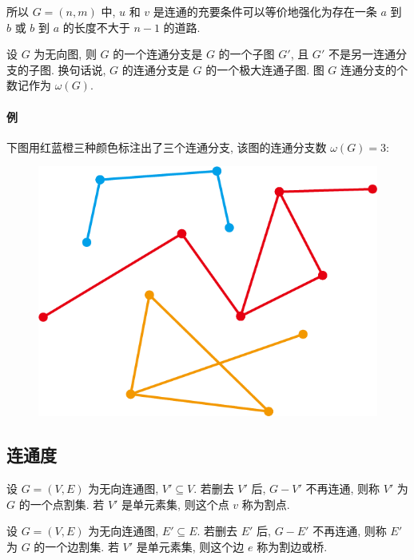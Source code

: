 \documentclass[UTF8]{ctexart}
\theoremstyle{mystyle}
\theoremstyle{myremark}
\theoremstyle{plain}
\begin{document}
所以 $ G = (n, m) $ 中, $ u $ 和 $ v $ 是连通的充要条件可以等价地强化为存在一条 $ a $ 到 $ b $ 或 $ b $ 到 $ a $ 的长度不大于 $ n - 1 $ 的道路.

\begin{definition}
    设 $ G $ 为无向图, 则 $ G $ 的一个连通分支是 $ G $ 的一个子图 $ G' $, 且 $ G' $ 不是另一连通分支的子图. 换句话说, $ G $ 的连通分支是 $ G $ 的一个极大连通子图. 图 $ G $ 连通分支的个数记作为 $ \omega(G) $.
\end{definition}

\paragraph{例}
下图用红蓝橙三种颜色标注出了三个连通分支, 该图的连通分支数 $ \omega(G) = 3 $:
\begin{figure}[H]
    \centering
    \includegraphics[width = 0.3\linewidth]{./images/branch.png}
\end{figure}



\subsection{连通度}
\begin{definition}
    设 $ G = (V, E) $ 为无向连通图, $ V' \subseteq V $. 若删去 $ V' $ 后, $ G - V' $ 不再连通, 则称 $ V' $ 为 $ G $ 的一个点割集. 若 $ V' $ 是单元素集, 则这个点 $ v $ 称为割点.
\end{definition}

\begin{definition}
    设 $ G = (V, E) $ 为无向连通图, $ E' \subseteq E $. 若删去 $ E' $ 后, $ G - E' $ 不再连通, 则称 $ E' $ 为 $ G $ 的一个边割集. 若 $ V' $ 是单元素集, 则这个边 $ e $ 称为割边或桥.
\end{definition}
\end{document}
